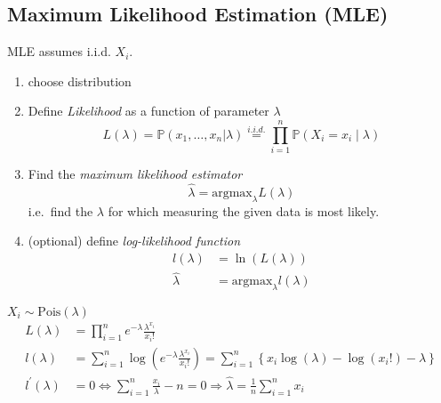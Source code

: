 \subsection{Maximum Likelihood Estimation (MLE)}
MLE assumes i.i.d. $X_i$.
\begin{enumerate}
    \item choose distribution
    \item Define \textit{Likelihood} as a function of parameter $\lambda$
          \noindent\begin{equation*}
              L(\lambda) = \mathbb{P}(x_1,\ldots ,x_n|\lambda) \stackrel{i.i.d.}{=} \prod_{i=1}^n\mathbb{P}(X_i=x_i\mid\lambda)
          \end{equation*}
    \item Find the \textit{maximum likelihood estimator}
          \noindent\begin{equation*}
              \widehat{\lambda} = \mathrm{argmax}_\lambda L(\lambda)
          \end{equation*}
          i.e.\ find the $\lambda$ for which measuring the given data is most likely.
    \item (optional) define \textit{log-likelihood function}
          \noindent\begin{align*}
              l(\lambda)    & = \ln(L(\lambda))                    \\
              \widehat{\lambda} & = \mathrm{argmax}_\lambda l(\lambda)
          \end{align*}
\end{enumerate}

\begin{examplesection}
    $X_i \sim \text{Pois}(\lambda)$
    \noindent\begin{align*}
        L(\lambda)          & =\prod_{i=1}^n e^{-\lambda}\frac{\lambda^{x_i}}{x_i!}                                                                               \\
        l(\lambda)          & =\sum_{i=1}^n\log\left(e^{-\lambda}\frac{\lambda^{x_i}}{x_i!}\right)=\sum_{i=1}^n\left\{x_i\log(\lambda)-\log(x_i!)-\lambda\right\} \\
        l^{\prime}(\lambda) & = 0 \Leftrightarrow \sum_{i=1}^n\frac{x_i}\lambda-n = 0 \Rightarrow \widehat{\lambda} =\frac1n\sum_{i=1}^n x_i
    \end{align*}
\end{examplesection}

